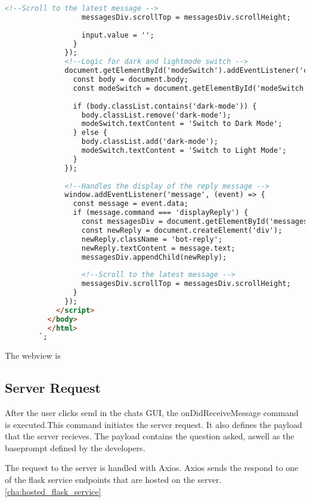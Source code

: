 \begin{lstlisting}[language=HTML, caption={IDE Chat GUI}]
                  <!--Scroll to the latest message -->
                  messagesDiv.scrollTop = messagesDiv.scrollHeight;
      
                  input.value = '';
                }
              });
              <!--Logic for dark and lightmode switch -->
              document.getElementById('modeSwitch').addEventListener('click', () => {
                const body = document.body;
                const modeSwitch = document.getElementById('modeSwitch');
      
                if (body.classList.contains('dark-mode')) {
                  body.classList.remove('dark-mode');
                  modeSwitch.textContent = 'Switch to Dark Mode';
                } else {
                  body.classList.add('dark-mode');
                  modeSwitch.textContent = 'Switch to Light Mode';
                }
              });
      
              <!--Handles the display of the reply message -->
              window.addEventListener('message', (event) => {
                const message = event.data;
                if (message.command === 'displayReply') {
                  const messagesDiv = document.getElementById('messages');
                  const newReply = document.createElement('div');
                  newReply.className = 'bot-reply';
                  newReply.textContent = message.text;
                  messagesDiv.appendChild(newReply);
      
                  <!--Scroll to the latest message -->
                  messagesDiv.scrollTop = messagesDiv.scrollHeight;
                }
              });
            </script>
          </body>
          </html>
        `;
\end{lstlisting}

The webview is 

\subsection{Server Request}


After the user clicks send in the chats GUI, the onDidReceiveMessage command is executed.This command initiates the server request.
It also defines the payload that the server recieves. The payload contains the question asked, aswell as the baseprompt defined by the developers. 

The request to the server is handled with Axios. Axios sends the respond to one of the flask service endpoints that are hosted on the server.
\ref{cha:hosted_flask_service}

